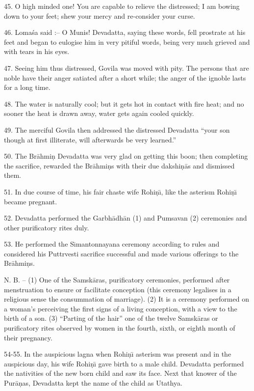 45. O high minded one! You are capable to relieve the distressed; I am bowing down to your feet; shew your mercy and re-consider your curse.

46. Loma\'sa said :-- O Munis! Devadatta, saying these words, fell prostrate at his feet and began to eulogise him in very pitiful words, being very much grieved and with tears in his eyes.

47. Seeing him thus distressed, Govila was moved with pity. The persons that are noble have their anger satiated after a short while; the anger of the ignoble lasts for a long time.

48. The water is naturally cool; but it gets hot in contact with fire heat; and no sooner the heat is drawn away, water gets again cooled quickly.

49. The merciful Govila then addressed the distressed Devadatta ``your son though at first illiterate, will afterwards be very learned.''

50. The Br\=ahmi\d{n} Devadatta was very glad on getting this boon; then completing the sacrifice, rewarded the Br\=ahmi\d{n}s with their due dakshi\d{n}\=as and dismissed them.

51. In due course of time, his fair chaste wife Rohi\d{n}\={\i}, like the asterism Rohi\d{n}\={\i} became pregnant.

52. Devadatta performed the Garbh\=adh\=an (1) and Pumsavan (2) ceremonies and other purificatory rites duly.

53. He performed the S\={\i}mantonnayana ceremony according to rules and considered his Puttrvesti sacrifice successful and made various offerings to the Br\=ahmi\d{n}s.

N. B. -- (1) One of the Samsk\=aras, purificatory ceremonies, performed after menstruation to ensure or facilitate conception (this ceremony legalises in a religious sense the consummation of marriage).
(2) It is a ceremony performed on a woman's perceiving the first signs of a living conception, with a view to the birth of a son.
(3) ``Parting of the hair'' one of the twelve Samsk\=aras or purificatory rites observed by women in the fourth, sixth, or eighth month of their pregnancy.

54-55. In the auspicious lagna when Rohi\d{n}\={\i} asterism was present and in the auspicious day, his wife Rohi\d{n}\={\i} gave birth to a male child. Devadatta performed the nativities of the new born child and saw its face. Next that knower of the Pur\=a\d{n}as, Devadatta kept the name of the child as Utathya.

